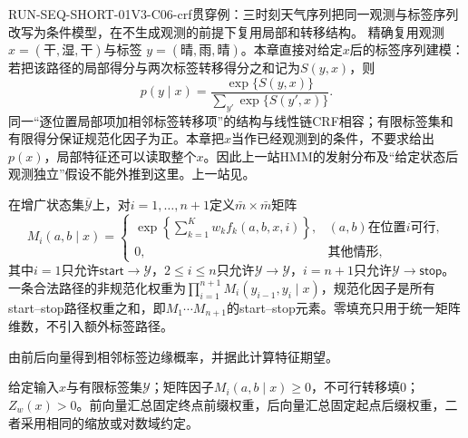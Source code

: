\begin{SLRunningExample}{RUN-SEQ-SHORT-01}{V3-C06-crf}{贯穿例：三时刻天气序列}{把同一观测与标签序列改写为条件模型，在不生成观测的前提下复用局部和转移结构。}
精确复用观测$x=(\text{干},\text{湿},\text{干})$与标签
$y=(\text{晴},\text{雨},\text{晴})$。本章直接对给定$x$后的标签序列建模：若把该路径的局部得分与两次标签转移得分之和记为$S(y,x)$，则
\[
p(y\mid x)=\frac{\exp\{S(y,x)\}}
{\sum_{y'}\exp\{S(y',x)\}}.
\]
同一“逐位置局部项加相邻标签转移项”的结构与线性链CRF相容；有限标签集和有限得分保证规范化因子为正。本章把$x$当作已经观测到的条件，不要求给出$p(x)$，局部特征还可以读取整个$x$。因此上一站HMM的发射分布及“给定状态后观测独立”假设不能外推到这里。上一站见。
\end{SLRunningExample}

在增广状态集$\overline{\mathcal Y}$上，对$i=1,\ldots,n+1$定义$\bar m\times\bar m$矩阵
\[
M_i(a,b\mid x)=
\begin{cases}
\exp\!\left\{\displaystyle\sum_{k=1}^{K}w_k f_k(a,b,x,i)\right\},
& (a,b)\text{在位置$i$可行},\\[4pt]
0,&\text{其他情形},
\end{cases}
\]
其中$i=1$只允许$\mathsf{start}\to\mathcal Y$，$2\leq i\leq n$只允许$\mathcal Y\to\mathcal Y$，$i=n+1$只允许$\mathcal Y\to\mathsf{stop}$。一条合法路径的非规范化权重为$\prod_{i=1}^{n+1}M_i(y_{i-1},y_i\mid x)$，规范化因子是所有start--stop路径权重之和，即$M_1\cdots M_{n+1}$的start--stop元素。零填充只用于统一矩阵维数，不引入额外标签路径。

\label{struct:V3-C06-CH11}

\begin{derivationgoalbox}
由前后向量得到相邻标签边缘概率，并据此计算特征期望。
\end{derivationgoalbox}
\begin{derivationprepbox}
给定输入$x$与有限标签集$\mathcal Y$；矩阵因子$M_i(a,b\mid x)\geq0$，不可行转移填0；$Z_w(x)>0$。前向量汇总固定终点前缀权重，后向量汇总固定起点后缀权重，二者采用相同的缩放或对数域约定。
\end{derivationprepbox}

